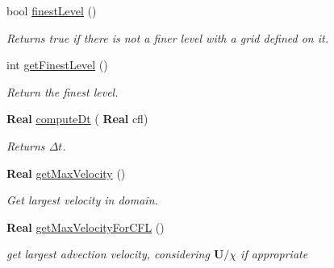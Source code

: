 \begin{DoxyCompactItemize}
\mbox{\label{class_a_m_r_level_mushy_layer_ad978d1a9a28c1ef557aa348807534eb4}} 
bool \hyperlink{class_a_m_r_level_mushy_layer_ad978d1a9a28c1ef557aa348807534eb4}{finest\+Level} ()
\begin{DoxyCompactList}\small\item\em Returns true if there is not a finer level with a grid defined on it. \end{DoxyCompactList}\item 
\mbox{\label{class_a_m_r_level_mushy_layer_a52cfb93ecc1e44063a1db80fb417017b}} 
int \hyperlink{class_a_m_r_level_mushy_layer_a52cfb93ecc1e44063a1db80fb417017b}{get\+Finest\+Level} ()
\begin{DoxyCompactList}\small\item\em Return the finest level. \end{DoxyCompactList}\item 
\mbox{\label{class_a_m_r_level_mushy_layer_a38c3d474a125f8cf66dd07e08ee02709}} 
\textbf{ Real} \hyperlink{class_a_m_r_level_mushy_layer_a38c3d474a125f8cf66dd07e08ee02709}{compute\+Dt} (\textbf{ Real} cfl)
\begin{DoxyCompactList}\small\item\em Returns $ \Delta t $. \end{DoxyCompactList}\item 
\mbox{\label{class_a_m_r_level_mushy_layer_aa758dba965ec2072e89a8bb75620db1b}} 
\textbf{ Real} \hyperlink{class_a_m_r_level_mushy_layer_aa758dba965ec2072e89a8bb75620db1b}{get\+Max\+Velocity} ()
\begin{DoxyCompactList}\small\item\em Get largest velocity in domain. \end{DoxyCompactList}\item 
\mbox{\label{class_a_m_r_level_mushy_layer_a3b410905a30aedc8bff12dd252e8ed6c}} 
\textbf{ Real} \hyperlink{class_a_m_r_level_mushy_layer_a3b410905a30aedc8bff12dd252e8ed6c}{get\+Max\+Velocity\+For\+C\+FL} ()
\begin{DoxyCompactList}\small\item\em get largest advection velocity, considering $ \mathbf{U}/\chi $ if appropriate \end{DoxyCompactList}\item 

\end{DoxyCompactItemize}
